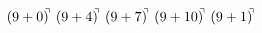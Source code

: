 \documentclass[preview]{standalone}
\begin{document}
\begin{align*}
(9+0)^{\hspace{-0.1cm}\urcorner} \ (9+4)^{\hspace{-0.1cm}\urcorner} \ (9+7)^{\hspace{-0.1cm}\urcorner} \ (9+10)^{\hspace{-0.1cm}\urcorner} \ (9+1)^{\hspace{-0.1cm}\urcorner}
\end{align*}
\end{document}
